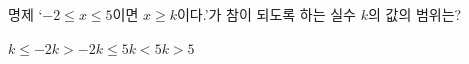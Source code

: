 명제 `$-2\le x\le 5$이면 $x\ge k$이다.'가 참이 되도록 하는 실수 $k$의 값의 범위는?
\begin{choices32}{$k\le -2$}{$k>-2$}{$k\le 5$}{$k<5$}{$k>5$}\end{choices32}
